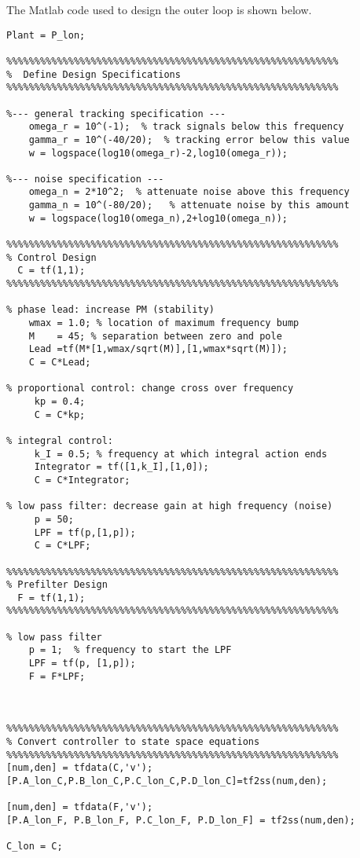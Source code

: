 The Matlab code used to design the outer loop is shown below.
\begin{lstlisting}
Plant = P_lon;

%%%%%%%%%%%%%%%%%%%%%%%%%%%%%%%%%%%%%%%%%%%%%%%%%%%%%%%%%%%
%  Define Design Specifications
%%%%%%%%%%%%%%%%%%%%%%%%%%%%%%%%%%%%%%%%%%%%%%%%%%%%%%%%%%%

%--- general tracking specification ---
    omega_r = 10^(-1);  % track signals below this frequency
    gamma_r = 10^(-40/20);  % tracking error below this value
    w = logspace(log10(omega_r)-2,log10(omega_r));
        
%--- noise specification ---
    omega_n = 2*10^2;  % attenuate noise above this frequency
    gamma_n = 10^(-80/20);   % attenuate noise by this amount
    w = logspace(log10(omega_n),2+log10(omega_n));

%%%%%%%%%%%%%%%%%%%%%%%%%%%%%%%%%%%%%%%%%%%%%%%%%%%%%%%%%%%
% Control Design
  C = tf(1,1);
%%%%%%%%%%%%%%%%%%%%%%%%%%%%%%%%%%%%%%%%%%%%%%%%%%%%%%%%%%%

% phase lead: increase PM (stability)
    wmax = 1.0; % location of maximum frequency bump
    M    = 45; % separation between zero and pole
    Lead =tf(M*[1,wmax/sqrt(M)],[1,wmax*sqrt(M)]);
    C = C*Lead;

% proportional control: change cross over frequency
     kp = 0.4;
     C = C*kp;

% integral control: 
     k_I = 0.5; % frequency at which integral action ends
     Integrator = tf([1,k_I],[1,0]);
     C = C*Integrator;
    
% low pass filter: decrease gain at high frequency (noise)
     p = 50;
     LPF = tf(p,[1,p]);
     C = C*LPF;

%%%%%%%%%%%%%%%%%%%%%%%%%%%%%%%%%%%%%%%%%%%%%%%%%%%%%%%%%%%
% Prefilter Design
  F = tf(1,1);
%%%%%%%%%%%%%%%%%%%%%%%%%%%%%%%%%%%%%%%%%%%%%%%%%%%%%%%%%%%

% low pass filter
    p = 1;  % frequency to start the LPF
    LPF = tf(p, [1,p]);
    F = F*LPF;


       
%%%%%%%%%%%%%%%%%%%%%%%%%%%%%%%%%%%%%%%%%%%%%%%%%%%%%%%%%%%
% Convert controller to state space equations
%%%%%%%%%%%%%%%%%%%%%%%%%%%%%%%%%%%%%%%%%%%%%%%%%%%%%%%%%%%
[num,den] = tfdata(C,'v');
[P.A_lon_C,P.B_lon_C,P.C_lon_C,P.D_lon_C]=tf2ss(num,den);

[num,den] = tfdata(F,'v');
[P.A_lon_F, P.B_lon_F, P.C_lon_F, P.D_lon_F] = tf2ss(num,den);

C_lon = C;
\end{lstlisting}

